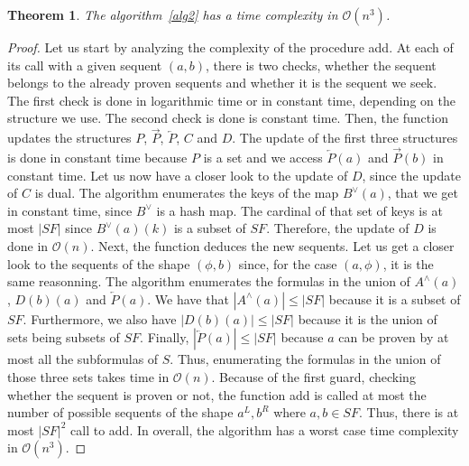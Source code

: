 \documentclass[a4paper, 11pt]{article}
\newtheorem{theorem}{Theorem}
\begin{document}
    \begin{theorem}
	    The algorithm~\ref{alg2} has a time complexity in $\mathcal{O}(n^3)$.
    \end{theorem}
    \begin{proof}
	    Let us start by analyzing the complexity of the procedure \textsf{add}. At each of its call
	    with a given sequent $(a,b)$, there is two checks, whether the sequent belongs to the already
	    proven sequents and whether it is the sequent we seek. The first check is done in logarithmic
	    time or in constant time, depending on the structure we use. The second check is done
	    is constant time. Then, the function updates the structures $P$, $\overrightarrow{P}$,
	    $\overleftarrow{P}$, $C$ and $D$. The update of the first three structures is done in 
	    constant time because $P$ is a set and we access $\overleftarrow{P}(a)$ and 
	    $\overrightarrow{P}(b)$ in constant time. Let us now have a closer look to the update of 
	    $D$, since the update of $C$ is dual. The algorithm enumerates the keys of the map 
	    $B^\vee(a)$, that we get in constant time, since $B^\vee$ is a hash map. The cardinal of 
	    that set of keys is at most
	    $|SF|$ since $B^\vee(a)(k)$ is a subset of $SF$. Therefore, the update of $D$ is done in
	    $\mathcal{O}(n)$. Next, the function deduces the new sequents. Let us get a closer look
	    to the sequents of the shape $(\phi,b)$ since, for the case $(a,\phi)$, it is the same
	    reasonning. The algorithm enumerates the formulas in the union of $A^\wedge(a)$, $D(b)(a)$
	    and $\overleftarrow{P}(a)$. We have that $|A^\wedge(a)|\leq|SF|$ because it is a subset
	    of $SF$. Furthermore, we also have $|D(b)(a)|\leq|SF|$ because it is the union of sets 
	    being subsets of $SF$. Finally, $|\overleftarrow{P}(a)|\leq|SF|$ because $a$ can be proven
	    by at most all the subformulas of $S$. Thus, enumerating the formulas in the union of those
	    three sets takes time in $\mathcal{O}(n)$. Because of the first guard, checking whether the
	    sequent is proven or not, the function \textsf{add} is called at most the number of possible 
	    sequents of the shape $a^L,b^R$ where $a,b\in SF$. Thus, there is at most $|SF|^2$ call to 
	    \textsf{add}. In overall, the algorithm has a worst case time complexity in 
	    $\mathcal{O}(n^3)$.


\end{proof}
\end{document}
